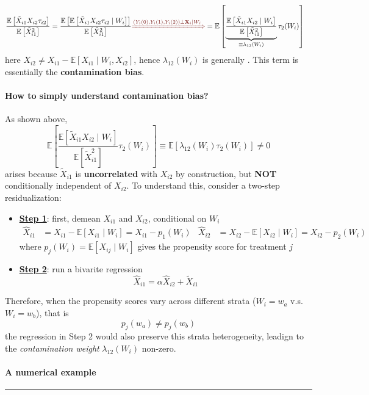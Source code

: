\documentclass[twoside]{article}
\begin{document}
\begin{itemize}
    \begin{align*}
        \frac{\mathbb{E}\left[ \tilde{X}_{i1} X_{i2}\tau_{i2} \right]}{\mathbb{E}\left[ \tilde{X}^2_{i1} \right]} &= \frac{\mathbb{E}\left[ \mathbb{E}\left[\tilde{X}_{i1} X_{i2}\tau_{i2}\mid W_i\right] \right]}{\mathbb{E}\left[ \tilde{X}^2_{i1} \right]} \textcolor{myred}{\xRightarrow{\left( Y_i(0),Y_i(1),Y_i(2) \right) \bot \mathbf{X}_i \mid W_i}} = \mathbb{E}\left[ \underbrace{\frac{\mathbb{E}\left[\tilde{X}_{i1}X_{i2}\mid W_i\right]}{\mathbb{E}\left[\tilde{X}_{i1}^2\right]}}_{\equiv \lambda_{12}(W_i)} \tau_2(W_i)\right]
    \end{align*}
    here $X_{i2} \neq X_{i1} - \mathbb{E}\left[ X_{i1} \mid W_i, X_{i2} \right] $, hence $\lambda_{12}(W_i)$ is generally . This term is essentially the \textbf{contamination bias}.
\end{itemize}

\paragraph*{How to simply understand contamination bias?}
As shown above,
\begin{equation*}
    \mathbb{E}\left[ \frac{\mathbb{E}\left[\tilde{X}_{i1}X_{i2}\mid W_i\right]}{\mathbb{E}\left[\tilde{X}_{i1}^2\right]} \tau_2(W_i)\right] \equiv \mathbb{E}\left[ \lambda_{12}(W_i) \tau_2(W_i)\right] \neq 0
\end{equation*}
arises because $\tilde{X}_{i1}$ is \textbf{uncorrelated} with $X_{i2}$ by construction, but \textbf{NOT} conditionally independent of $X_{i2}$. To understand this, consider a two-step residualization:
\begin{itemize}
    \item \underline{\textbf{Step 1}}: first, demean $X_{i1}$ and $X_{i2}$, conditional on $W_i$
    \begin{align*}
        \hat{X}_{i1} &= X_{i1} - \mathbb{E}\left[X_{i1} \mid W_i\right] = X_{i1}- p_1(W_i) & \hat{X}_{i2}&= X_{i2}-\mathbb{E}\left[X_{i2}\mid W_i\right] = X_{i2} - p_2(W_i)
    \end{align*}
    where $p_j(W_i) = \mathbb{E}\left[X_{ij}\mid W_i\right]$ gives the propensity score for treatment $j$
    \item \underline{\textbf{Step 2}}: run a bivarite regression 
    $$
    \hat{X}_{i1} = \alpha \hat{X}_{i2} + \tilde{X}_{i1}
    $$
\end{itemize}
Therefore, when the propensity scores vary across different strata ($W_i=w_a$ v.s. $W_i=w_b$), that is $$ p_j(w_a) \neq p_j(w_b) $$
the regression in Step 2 would also preserve this strata heterogeneity, leadign to the \textit{contamination weight} $\lambda_{12}(W_i)$ non-zero.

\paragraph*{A numerical example} 

\newpage
\vspace*{20pt}
\noindent\rule{0.995\textwidth}{0.5pt}
\vspace*{-10pt}


\end{document}
